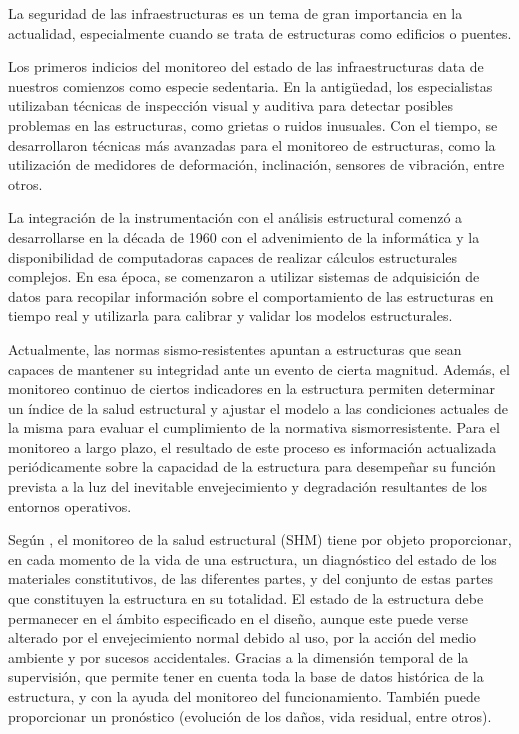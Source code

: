 La seguridad de las infraestructuras es un tema de gran importancia en la actualidad, especialmente cuando se trata de estructuras como edificios o puentes.

Los primeros indicios del monitoreo del estado de las infraestructuras data de nuestros comienzos como especie sedentaria.  En la antigüedad, los especialistas utilizaban técnicas de inspección visual y auditiva para detectar posibles problemas en las estructuras, como grietas o ruidos inusuales. Con el tiempo, se desarrollaron técnicas más avanzadas para el monitoreo de estructuras, como la utilización de medidores de deformación, inclinación, sensores de vibración, entre otros.

La integración de la instrumentación con el análisis estructural comenzó a desarrollarse en la década de 1960 con el advenimiento de la informática y la disponibilidad de computadoras capaces de realizar cálculos estructurales complejos. En esa época, se comenzaron a utilizar sistemas de adquisición de datos para recopilar información sobre el comportamiento de las estructuras en tiempo real y utilizarla para calibrar y validar los modelos estructurales.

Actualmente, las normas sismo-resistentes apuntan a estructuras que sean capaces de mantener su integridad ante un evento de cierta magnitud. Además, el monitoreo continuo de ciertos indicadores en la estructura permiten determinar un índice de la salud estructural y ajustar el modelo a las condiciones actuales de la misma para evaluar el cumplimiento de la normativa sismorresistente. Para el monitoreo a largo plazo, el resultado de este proceso es información actualizada periódicamente sobre la capacidad de la estructura para desempeñar su función prevista a la luz del inevitable envejecimiento y degradación resultantes de los entornos operativos.

Según \citep{balageas2010structural}, el monitoreo de la salud estructural (SHM) tiene por objeto proporcionar, en cada momento de la vida de una estructura, un diagnóstico del estado de los materiales constitutivos, de las diferentes
partes, y del conjunto de estas partes que constituyen la estructura en su totalidad. El estado de la estructura debe permanecer en el ámbito especificado en el diseño, aunque este puede verse alterado por el envejecimiento normal debido al uso, por la acción del medio ambiente y por sucesos accidentales. Gracias a la dimensión temporal de la supervisión, que permite tener en cuenta toda la base de datos histórica de la estructura, y con la ayuda del monitoreo del funcionamiento. También puede proporcionar un pronóstico (evolución de los daños, vida residual, entre otros).

